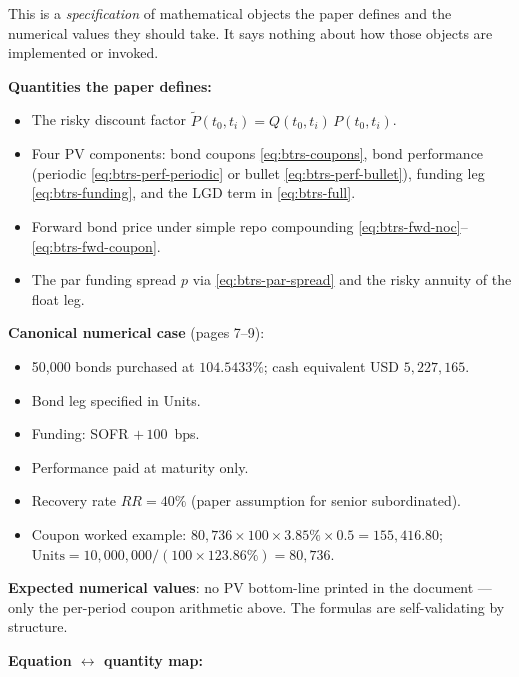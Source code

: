 \documentclass[11pt,a4paper]{article}
\begin{document}
\begin{validation}
This is a \emph{specification} of mathematical objects the paper
defines and the numerical values they should take. It says nothing
about how those objects are implemented or invoked.

\textbf{Quantities the paper defines:}
\begin{itemize}[noitemsep]
  \item The risky discount factor $\widetilde P(t_0, t_i) =
        Q(t_0, t_i)\, P(t_0, t_i)$.
  \item Four PV components: bond coupons \eqref{eq:btrs-coupons},
        bond performance (periodic \eqref{eq:btrs-perf-periodic} or
        bullet \eqref{eq:btrs-perf-bullet}), funding leg
        \eqref{eq:btrs-funding}, and the LGD term in
        \eqref{eq:btrs-full}.
  \item Forward bond price under simple repo compounding
        \eqref{eq:btrs-fwd-noc}--\eqref{eq:btrs-fwd-coupon}.
  \item The par funding spread $p$ via \eqref{eq:btrs-par-spread} and
        the risky annuity of the float leg.
\end{itemize}

\textbf{Canonical numerical case} (pages 7--9):
\begin{itemize}[noitemsep]
  \item 50,000 bonds purchased at $104.5433\%$;
        cash equivalent USD $5{,}227{,}165$.
  \item Bond leg specified in Units.
  \item Funding: SOFR $+\,100$~bps.
  \item Performance paid at maturity only.
  \item Recovery rate $RR = 40\%$ (paper assumption for senior subordinated).
  \item Coupon worked example: $80{,}736 \times 100 \times 3.85\% \times 0.5 = 155{,}416.80$;
        $\text{Units} = 10{,}000{,}000 / (100 \times 123.86\%) = 80{,}736$.
\end{itemize}

\textbf{Expected numerical values}: no PV bottom-line printed in the
document --- only the per-period coupon arithmetic above. The
formulas are self-validating by structure.

\textbf{Equation $\leftrightarrow$ quantity map:}


\end{validation}
\end{document}
